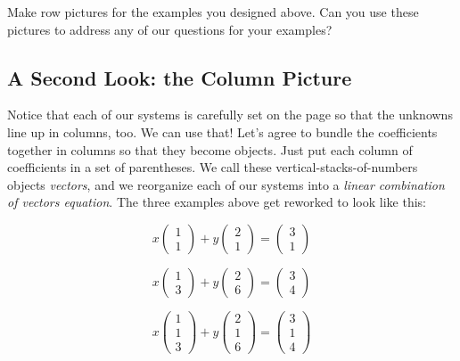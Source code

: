 \documentclass[elementsmain.tex]{subfiles}
\begin{document}
\begin{readingex} Make row pictures for the examples you designed above. Can you use these pictures to address any of our questions for your examples?
\end{readingex}

\subsection*{A Second Look: the Column Picture}

Notice that each of our systems is carefully set on the page so that the unknowns line up in columns, too.
We can use that! Let's agree to bundle the coefficients together in columns so that they become objects. Just put each column of coefficients in a set of parentheses. We call these vertical-stacks-of-numbers objects \emph{vectors}, and we reorganize each of our systems into a \emph{linear combination of vectors equation}. The three examples above get reworked to look like this:

\[\tag{A}
x\begin{pmatrix}1\\1\end{pmatrix} + y\begin{pmatrix}2\\1\end{pmatrix} = \begin{pmatrix} 3 \\ 1 \end{pmatrix}
\]

\[\tag{B}
x\begin{pmatrix}1\\3\end{pmatrix} + y\begin{pmatrix}2\\6\end{pmatrix} = \begin{pmatrix} 3 \\ 4 \end{pmatrix}
\]

\[\tag{C}
x\begin{pmatrix}1\\1\\3\end{pmatrix} + y\begin{pmatrix}2\\1\\6\end{pmatrix} = \begin{pmatrix} 3 \\1\\4 \end{pmatrix}
\]
\end{document}
